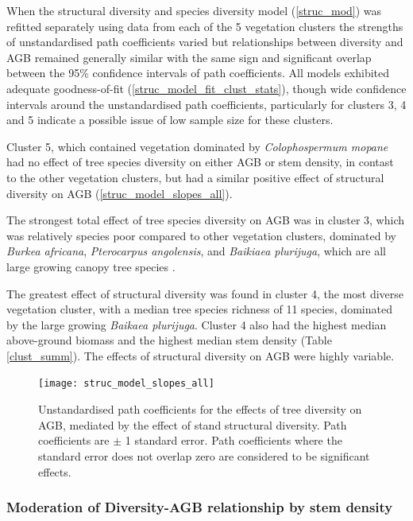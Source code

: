 \documentclass[11pt,a4paper]{article}
\begin{document}
When the structural diversity and species diversity model (\autoref{struc_mod}) was refitted separately using data from each of the 5 vegetation clusters the strengths of unstandardised path coefficients varied but relationships between diversity and AGB remained generally similar with the same sign and significant overlap between the 95\% confidence intervals of path coefficients. All models exhibited adequate goodness-of-fit (\autoref{struc_model_fit_clust_stats}), though wide confidence intervals around the unstandardised path coefficients, particularly for clusters 3, 4 and 5 indicate a possible issue of low sample size for these clusters.

Cluster 5, which contained vegetation dominated by \textit{Colophospermum mopane} had no effect of tree species diversity on either AGB or stem density, in contast to the other vegetation clusters, but had a similar positive effect of structural diversity on AGB (\autoref{struc_model_slopes_all}).

The strongest total effect of tree species diversity on AGB was in cluster 3, which was relatively species poor compared to other vegetation clusters, dominated by \textit{Burkea africana}, \textit{Pterocarpus angolensis}, and \textit{Baikiaea plurijuga}, which are all large growing canopy tree species \citep{}.

The greatest effect of structural diversity was found in cluster 4, the most diverse vegetation cluster, with a median tree species richness of 11 species, dominated by the large growing \textit{Baikaea plurijuga}. Cluster 4 also had the highest median above-ground biomass and the highest median stem density (Table \autoref{clust_summ}). The effects of structural diversity on AGB were highly variable.

\begin{figure}[H]
\centering
	\texttt{[image: struc\_model\_slopes\_all]}
	\caption{Unstandardised path coefficients for the effects of tree diversity on AGB, mediated by the effect of stand structural diversity. Path coefficients are $\pm$ 1 standard error. Path coefficients where the standard error does not overlap zero are considered to be significant effects.}
	\label{struc_model_slopes_all}
\end{figure}




\subsubsection{Moderation of Diversity-AGB relationship by stem density}
\end{document}
